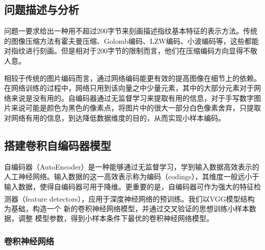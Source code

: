 \documentclass{whutmod}
\newcommand{\upcite}[1]{\textsuperscript{\cite{#1}}}
\begin{document}
		\subsection{问题描述与分析}
			问题一要求给出一种用不超过200字节来刻画描述指纹基本特征的表示方法。传统的图像压缩方法有霍夫曼压缩、Golomb编码、LZW编码、小波编码等，这些都能对指纹进行刻画。但是相对于200字节的限制而言，他们在压缩编码方向显得不敬人意。
			
			相较于传统的图片编码而言，通过网络编码能更有效的提高图像在细节上的依赖。在网络训练的过程中，网络只用到该向量之中少量元素，其中的大部分元素对于网络来说是没有用的。自编码器通过无监督学习来提取有用的信息，对于手写数字图片来说可能是颜色为黑色的像素点，将图片中的很大一部分白色像素舍弃，只提取对网络有用的信息，到达降低数据维度的目的，从而实现小样本编码。
		
%			
		\subsection{搭建卷积自编码器模型}
		   自编码器（AutoEncoder）是一种能够通过无监督学习，学到输入数据高效表示的人工神经网络。输入数据的这一高效表示称为编码（codings），其维度一般远小于输入数据，使得自编码器可用于降维。更重要的是，自编码器可作为强大的特征检测器（feature detectors），应用于深度神经网络的预训练。我们以VGG模型\upcite{4}结构为基础，构造一个 新的卷积神经网络模型，并通过交叉验证的思想训练小样本数据，调整
		   模型参数，得到小样本条件下最优的卷积神经网络模型。
		
			\subsubsection{卷积神经网络}
			
\end{document}

